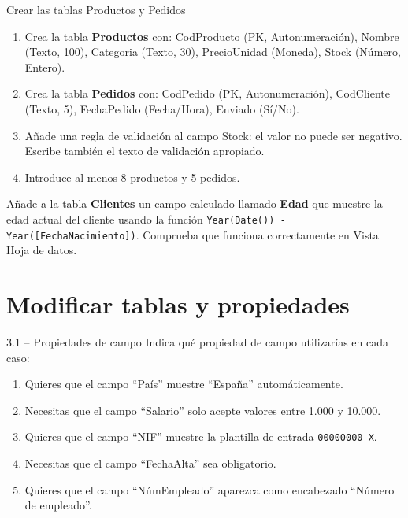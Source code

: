 \documentclass[12pt,a4paper]{article}
\begin{document}
\begin{practica}{Crear las tablas Productos y Pedidos}
\begin{enumerate}
  \item Crea la tabla \textbf{Productos} con: CodProducto (PK, Autonumeración), Nombre (Texto, 100), Categoria (Texto, 30), PrecioUnidad (Moneda), Stock (Número, Entero).
  \item Crea la tabla \textbf{Pedidos} con: CodPedido (PK, Autonumeración), CodCliente (Texto, 5), FechaPedido (Fecha/Hora), Enviado (Sí/No).
  \item Añade una regla de validación al campo Stock: el valor no puede ser negativo. Escribe también el texto de validación apropiado.
  \item Introduce al menos 8 productos y 5 pedidos.
\end{enumerate}
\end{practica}

\begin{reto}
Añade a la tabla \textbf{Clientes} un campo calculado llamado \textbf{Edad} que muestre la edad actual del cliente usando la función \texttt{Year(Date()) - Year([FechaNacimiento])}. Comprueba que funciona correctamente en Vista Hoja de datos.
\end{reto}

\section{Modificar tablas y propiedades}

\begin{ejercicio}{3.1 -- Propiedades de campo}
Indica qué propiedad de campo utilizarías en cada caso:
\begin{enumerate}[label=\alph*)]
  \item Quieres que el campo ``País'' muestre ``España'' automáticamente.
  \item Necesitas que el campo ``Salario'' solo acepte valores entre 1.000 y 10.000.
  \item Quieres que el campo ``NIF'' muestre la plantilla de entrada \texttt{00000000-X}.
  \item Necesitas que el campo ``FechaAlta'' sea obligatorio.
  \item Quieres que el campo ``NúmEmpleado'' aparezca como encabezado ``Número de empleado''.
\end{enumerate}
\end{ejercicio}
\end{document}
